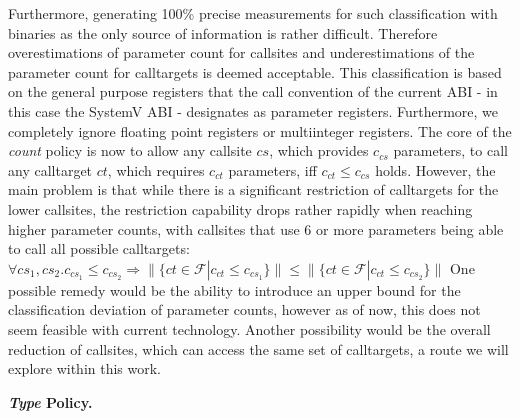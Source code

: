  Furthermore, generating 100\% precise measurements for such classification with binaries as the only source of information is rather difficult. 
 Therefore overestimations of parameter count for callsites and underestimations of the parameter count for calltargets is deemed acceptable. 
 This classification is based on the general purpose registers that the call convention of the current ABI - in this case the 
 SystemV ABI - designates as parameter registers. Furthermore, we completely ignore floating point registers or multiinteger registers. 
 The core of the \emph{count} policy is now to allow any callsite $cs$, which provides $c_{cs}$ parameters, to call any calltarget $ct$, 
 which requires $c_{ct}$ parameters, iff $c_{ct} \leq c_{cs}$ holds. However, the main problem is that while there is a significant 
 restriction of calltargets for the lower callsites, the restriction capability drops rather rapidly when reaching higher parameter 
 counts, with callsites that use 6 or more parameters being able to call all possible calltargets:
$
	\forall cs_1, cs_2.  c_{cs_1} \leq c_{cs_2} \Longrightarrow  \| \{ct \in \mathcal{F} | c_{ct} \leq c_{cs_1} \} \| \leq \| \{ct \in \mathcal{F} | c_{ct} \leq c_{cs_2}  \} \|
$
One possible remedy would be the ability to introduce an upper bound for the classification deviation of parameter counts, 
however as of now, this does not seem feasible with current technology. Another possibility would be the overall reduction
of callsites, which can access the same set of calltargets, a route we will explore within this work.

\textbf{\emph{Type} Policy.}
\label{section:typepolicy}

